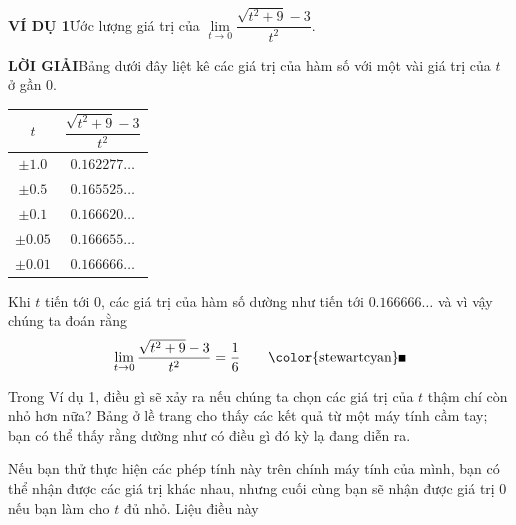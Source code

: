 \begin{minipage}[t]{0.69\textwidth}
    \vspace{0pt}
    \noindent\textbf{\textsf{\color{stewartcyan}VÍ DỤ 1}}\quad Ước lượng giá trị của $\lim\limits_{t \to 0} \dfrac{\sqrt{t^2 + 9} - 3}{t^2}$.

    \vspace{0.8em}
    \noindent\textbf{\textsf{\color{stewartcyan}LỜI GIẢI}}\quad Bảng dưới đây liệt kê các giá trị của hàm số với một vài giá trị của $t$ ở gần 0.

    \vspace{0.5em}
    \begin{center}
    \renewcommand{\arraystretch}{1.25}
    \begin{tabular}{|c|c|}
    \hline
    \rowcolor{stewarttablehead}
    $t$ & $\dfrac{\sqrt{t^2 + 9} - 3}{t^2}$ \\
    \hline
    $\pm 1.0$ & $0.162277\dots$ \\
    $\pm 0.5$ & $0.165525\dots$ \\
    $\pm 0.1$ & $0.166620\dots$ \\
    $\pm 0.05$ & $0.166655\dots$ \\
    $\pm 0.01$ & $0.166666\dots$ \\
    \hline
    \end{tabular}
    \end{center}

    \vspace{0.5em}
    Khi $t$ tiến tới 0, các giá trị của hàm số dường như tiến tới $0.166666\dots$ và vì vậy chúng ta đoán rằng
    \[
    \lim_{t \to 0} \frac{\sqrt{t^2 + 9} - 3}{t^2} = \frac{1}{6}
    \tag*{{\color{stewartcyan}\rule{1.1ex}{1.1ex}}}
    \]

    \vspace{0.6em}
    Trong Ví dụ 1, điều gì sẽ xảy ra nếu chúng ta chọn các giá trị của $t$ thậm chí còn nhỏ hơn nữa? Bảng ở lề trang cho thấy các kết quả từ một máy tính cầm tay; bạn có thể thấy rằng dường như có điều gì đó kỳ lạ đang diễn ra.

    \vspace{0.8em}
    Nếu bạn thử thực hiện các phép tính này trên chính máy tính của mình, bạn có thể nhận được các giá trị khác nhau, nhưng cuối cùng bạn sẽ nhận được giá trị 0 nếu bạn làm cho $t$ đủ nhỏ. Liệu điều này
\end{minipage}
